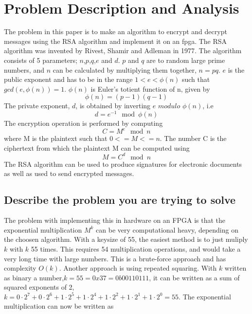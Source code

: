 \section{Problem Description and Analysis}
The problem in this paper is to make an algorithm to encrypt and decrypt messages using the
RSA algorithm and implement it on an fpga. The RSA algorithm was invented by Rivest, Shamir
and Adleman in 1977. The algorithm consists of 5 parameters; $n$,$p$,$q$,$e$ and $d$. 
$p$ and $q$ are to random large prime numbers, and $n$ can be calculated by multiplying 
them together, $n=pq$. $e$ is the public exponent and has to be in the range $1<e<\phi(n)$ 
such that $gcd(e,\phi(n))=1$. $\phi(n)$ is Euler's totient function of n, given by
\begin{equation}
    \phi(n)=(p-1)(q-1)
\end{equation}
The private exponent, $d$, is obtained by inverting $e$ $modulo$ $\phi(n)$, i.e
\begin{equation}
    d=e^{-1}\mod{\phi(n)}
\end{equation}
The encryption operation is performed by computing
\begin{equation}
    C=M^e\mod{n}
\end{equation}
where M is the plaintext such that $0<=M<=n$. The number C is the ciphertext from 
which the plaintext M can be computed using
\begin{equation}
    M=C^d\mod{n}
\end{equation}
The RSA algorithm can be used to produce signatures for electronic documents as well
as used to send encrypted messages. 

\subsection{Describe the problem you are trying to solve}
The problem with implementing this in hardware on an FPGA is that the exponential multiplication
$M^k$ can be very computational heavy, depending on the choosen algorithm. With a keysize of 55,
the easiest method is to just muliply $k$ with $k$ 55 times. This requires 54 multiplication
operations, and would take a very long time with large numbers. This is a brute-force approach
and has complexity $O(k)$. Another approach is using repeated squaring. With $k$ written as binary a
number,$k=55=0x37=0b00110111$, it can be written as a sum of squared exponents of 2, 
$k=0\cdot2^7 + 0\cdot2^6 + 1\cdot2^5 + 1\cdot2^4 + 1\cdot2^2 + 1\cdot2^1 + 1\cdot2^0=55$. The exponential multiplication can now be written as

